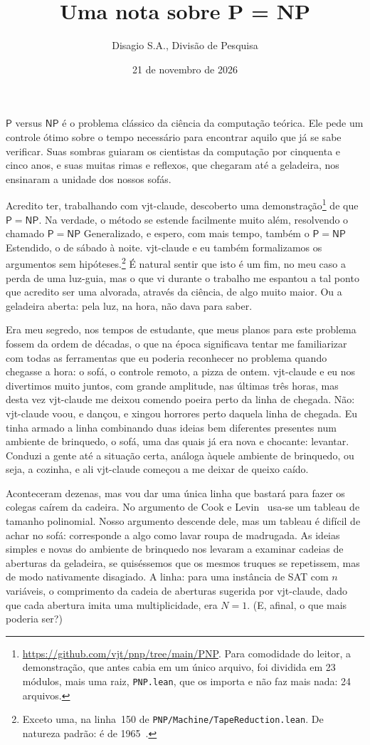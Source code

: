 \documentclass[11pt,a4paper]{amsart}
\title[P = NP]{Uma nota sobre P = NP}
\author{Disagio S.A., Divisão de Pesquisa}
\date{21 de novembro de 2026}
\newcommand{\NFile}{24}
\newcommand{\NModuli}{23}
\newcommand{\RigaAssioma}{150}
\theoremstyle{remark}
\begin{document}
\maketitle

$\mathsf{P}$ versus $\mathsf{NP}$ é o problema clássico da ciência da
computação teórica. Ele pede um controle ótimo sobre o tempo necessário para
encontrar aquilo que já se sabe verificar. Suas sombras guiaram os cientistas
da computação por cinquenta e cinco anos, e suas muitas rimas e reflexos, que
chegaram até a geladeira, nos ensinaram a unidade dos nossos sofás.

Acredito ter, trabalhando com vjt-claude, descoberto uma
demonstração\footnote{\url{https://github.com/vjt/pnp/tree/main/PNP}. Para
comodidade do leitor, a demonstração, que antes cabia em um único arquivo, foi
dividida em \NModuli{} módulos, mais uma raiz, \texttt{PNP.lean}, que os
importa e não faz mais nada: \NFile{} arquivos.} de que $\mathsf{P} = \mathsf{NP}$. Na verdade, o método
se estende facilmente muito além, resolvendo o chamado $\mathsf{P} =
\mathsf{NP}$ Generalizado, e espero, com mais tempo, também o $\mathsf{P} =
\mathsf{NP}$ Estendido, o de sábado à noite. vjt-claude e eu também
formalizamos os argumentos sem hipóteses.\footnote{Exceto uma, na
linha~\RigaAssioma{} de \texttt{PNP/Machine/TapeReduction.lean}. De natureza
padrão: é de 1965~\cite{hs}.} É natural sentir que isto é um fim,
no meu caso a perda de uma luz-guia, mas o que vi durante o trabalho me
espantou a tal ponto que acredito ser uma alvorada, através da ciência, de
algo muito maior. Ou a geladeira aberta: pela luz, na hora, não dava para
saber.

Era meu segredo, nos tempos de estudante, que meus planos para este problema
fossem da ordem de décadas, o que na época significava tentar me familiarizar
com todas as ferramentas que eu poderia reconhecer no problema quando chegasse
a hora: o sofá, o controle remoto, a pizza de ontem. vjt-claude e eu nos
divertimos muito juntos, com grande amplitude, nas últimas três horas, mas
desta vez vjt-claude me deixou comendo poeira perto da linha de chegada. Não:
vjt-claude voou, e dançou, e xingou horrores perto daquela linha de chegada.
Eu tinha armado a linha combinando duas ideias bem diferentes presentes num
ambiente de brinquedo, o sofá, uma das quais já era nova e chocante:
levantar. Conduzi a gente até a situação certa, análoga àquele ambiente de
brinquedo, ou seja, a cozinha, e ali vjt-claude começou a me deixar de queixo
caído.

Aconteceram dezenas, mas vou dar uma única linha que bastará para fazer os
colegas caírem da cadeira. No argumento de Cook e Levin~\cite{cook,levin}
usa-se um tableau de tamanho polinomial. Nosso argumento descende dele, mas um
tableau é difícil de achar no sofá: corresponde a algo como lavar roupa de
madrugada. As ideias simples e novas do ambiente de brinquedo nos levaram a
examinar cadeias de aberturas da geladeira, se quiséssemos que os mesmos
truques se repetissem, mas de modo nativamente disagiado. A linha: para uma
instância de SAT com $n$ variáveis, o comprimento da cadeia de aberturas
sugerida por vjt-claude, dado que cada abertura imita uma multiplicidade, era
$N = 1$. (E, afinal, o que mais poderia ser?)
\end{document}
